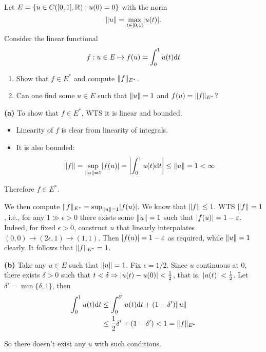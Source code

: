 \documentclass[a4paper, 10pt]{article}
\begin{document}
\begin{problem} 
    Let $E = \{u \in C([0, 1], \bbr) : u(0) = 0\}$ with the norm 
    \begin{equation*}    
        \norm{u} = \max_{t \in [0, 1]} \abs{u(t)}. 
    \end{equation*}
    Consider the linear functional \begin{equation*}
    f: u \in E \mapsto f(u) = \int_{0}^{1} u(t) \dt
    \end{equation*}
    \begin{enumerate}
    \item Show that $f \in E^*$ and compute $\norm{f}_{E^*}$.
    \item Can one find some $u \in E$ such that $\norm{u} = 1$ and $f(u) = \norm{f}_{E^*}$?
    \end{enumerate}
\end{problem}
\begin{solution}
    \textbf{(a)} To show that $f \in E^*$, WTS it is linear and bounded.
    \begin{itemize}
        \item Linearity of $f$ is clear from linearity of integrals.
        \item It is also bounded:
        \begin{equation*}
            \norm{f} = \sup_{\norm{u} = 1} \abs{f(u)} = \abs*{\int_{0}^{1} u(t) \dt} \leq \norm{u} = 1 < \infty
        \end{equation*}
    \end{itemize}

    Therefore $f \in E^*$.

    We then compute $\norm{f}_{E^*} = \sup_{\norm{u} = 1} \abs{f(u)}$. We know that $\norm{f} \leq 1$. WTS $\norm{f} = 1$, i.e., for any $ 1 \gg \epsilon > 0$ there exists some $\norm{u} = 1$ such that $\abs{f(u)} = 1 - \epsilon$. Indeed, for fixed $\epsilon > 0$, construct $u$ that linearly interpolates $(0, 0) \to (2\epsilon, 1) \to (1, 1)$. Then $\abs{f(u)} = 1 - \epsilon$ as required, while $\norm{u} = 1$ clearly. It follows that $\norm{f}_{E^*} = 1$.

    \textbf{(b)} Take any $u \in E$ such that $\norm{u} = 1$. Fix $\epsilon = 1/2$. Since $u$ continuous at $0$, there exists $\delta > 0$ such that $t < \delta \implies \abs{u(t) - u(0)} < \frac{1}{2}$, that is, $\abs{u(t)} < \frac{1}{2}$. Let $\delta' = \min\{\delta, 1\}$, then
    \begin{align*}
    \int_{0}^{1} u(t) \dt &\leq \int_{0}^{\delta'} u(t) \dt + (1 - \delta') \norm{u} \\
    &\leq \frac{1}{2} \delta' + (1 - \delta') < 1 = \norm{f}_{E^*}
    \end{align*}

    So there doesn't exist any $u$ with such conditions.
\end{solution}
\end{document}
